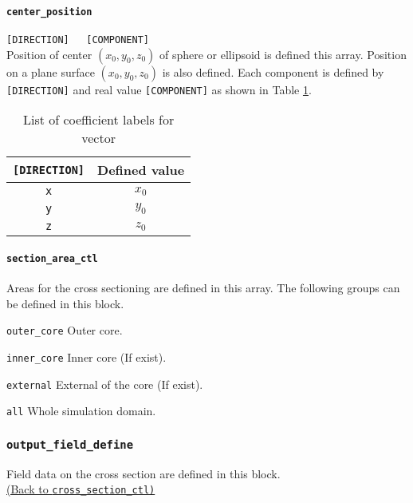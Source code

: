 \paragraph{\tt center\_position}
\label{href_t:psf_center_position}
\verb|[DIRECTION]	[COMPONENT]| \\
Position of center $(x_{0}, y_{0}, z_{0})$ of sphere or ellipsoid is defined this array. Position on a plane surface $(x_{0}, y_{0}, z_{0})$ is also defined. Each component is defined by \verb|[DIRECTION]| and real value \verb|[COMPONENT]| as shown in Table \ref{table:psf_position}.
%
\begin{table}[htp]
\caption{List of coefficient labels for vector}
\begin{center}
\begin{tabular}{|c|c|}
\hline
\verb|[DIRECTION]| & Defined value \\ \hline
\verb|x| & $x_{0}$ \\
\verb|y| & $y_{0}$ \\
\verb|z| & $z_{0}$ \\ \hline
\end{tabular}
\end{center}
\label{table:psf_position}
\end{table}
%

\paragraph{\tt section\_area\_ctl}
\label{href_t:section_area_ctl}
Areas for the cross sectioning are defined in this array. The following groups can be defined in this block.
%
\begin{description}
	\item{\tt outer\_core} Outer core.
	\item{\tt inner\_core} Inner core (If exist).
	\item{\tt external} External of the core (If exist).
	\item{\tt all} Whole simulation domain.
\end{description}

%
\subsubsection{\tt output\_field\_define}
\label{href_t:output_field_define}
Field data on the cross section are defined in this block. \\
\hyperref[href_i:cross_section_ctl]{(Back to {\tt cross\_section\_ctl)}} \\

